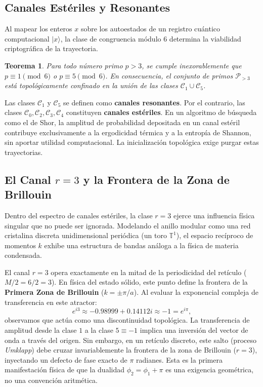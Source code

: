 \documentclass[12pt,a4paper]{article}
\theoremstyle{plain}
\newtheorem{teorema}{Teorema}[section]
\theoremstyle{definition}
\theoremstyle{remark}
\begin{document}
\subsection{Canales Estériles y Resonantes}

Al mapear los enteros $x$ sobre los autoestados de un registro cuántico computacional $|x\rangle$, la clase de congruencia módulo 6 determina la viabilidad criptográfica de la trayectoria. 

\begin{teorema}
Para todo número primo $p>3$, se cumple inexorablemente que $p \equiv 1 \pmod{6}$ o $p \equiv 5 \pmod{6}$. En consecuencia, el conjunto de primos $\mathcal{P}_{>3}$ está topológicamente confinado en la unión de las clases $\mathcal{C}_1 \cup \mathcal{C}_5$.
\end{teorema}

Las clases $\mathcal{C}_1$ y $\mathcal{C}_5$ se definen como \textbf{canales resonantes}. Por el contrario, las clases $\mathcal{C}_0,\mathcal{C}_2,\mathcal{C}_3,\mathcal{C}_4$ constituyen \textbf{canales estériles}. En un algoritmo de búsqueda como el de Shor, la amplitud de probabilidad depositada en un canal estéril contribuye exclusivamente a la ergodicidad térmica y a la entropía de Shannon, sin aportar utilidad computacional. La inicialización topológica exige purgar estas trayectorias.

\subsection{El Canal $r=3$ y la Frontera de la Zona de Brillouin}

Dentro del espectro de canales estériles, la clase $r=3$ ejerce una influencia física singular que no puede ser ignorada. Modelando el anillo modular como una red cristalina discreta unidimensional periódica (un toro $\mathbb{T}^1$), el espacio recíproco de momentos $k$ exhibe una estructura de bandas análoga a la física de materia condensada.

El canal $r=3$ opera exactamente en la mitad de la periodicidad del retículo ($M/2 = 6/2 = 3$). En física del estado sólido, este punto define la frontera de la \textbf{Primera Zona de Brillouin} ($k = \pm \pi/a$). Al evaluar la exponencial compleja de transferencia en este atractor:
\begin{equation}
e^{i3} \approx -0.98999 + 0.14112i \approx -1 = e^{i\pi},
\end{equation}
observamos que actúa como una discontinuidad topológica. La transferencia de amplitud desde la clase $1$ a la clase $5 \equiv -1$ implica una inversión del vector de onda a través del origen. Sin embargo, en un retículo discreto, este salto (proceso \textit{Umklapp}) debe cruzar invariablemente la frontera de la zona de Brillouin ($r=3$), inyectando un defecto de fase exacto de $\pi$ radianes. Esta es la primera manifestación física de que la dualidad $\phi_2 = \phi_1 + \pi$ es una exigencia geométrica, no una convención aritmética.
\end{document}
